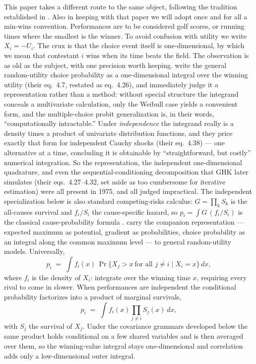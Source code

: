 \documentclass[11pt]{article}
\begin{document}
This paper takes a different route to the same object, following the tradition established in \citet{cotton2021}. Also in keeping with that paper we will adopt once and for all a min-wins
convention. Performances are to be considered golf scores, or running times where the smallest is the winner. To avoid confusion with utility we write $X_i=-U_i$. The crux is that the choice event itself is one-dimensional, by which we mean that contestant $i$ wins
when its time beats the field. The observation is as old as the subject, with one precision worth
keeping. \citet{domencich1975} write the general random-utility choice
probability as a one-dimensional integral over the winning utility
(their eq.~4.7, restated as eq.~4.26), and immediately judge it a
representation rather than a method: without special structure the
integrand conceals a multivariate calculation, only the Weibull case
yields a convenient form, and the multiple-choice probit generalization
is, in their words, ``computationally intractable.'' Under
\emph{independence} the integrand really is a density times a product of
univariate distribution functions, and they price exactly that form for
independent Cauchy shocks (their eq.~4.38) --- one alternative at a
time, concluding it is obtainable by ``straightforward, but costly''
numerical integration. So the representation, the independent
one-dimensional quadrature, and even the sequential-conditioning
decomposition that GHK later simulates (their eqs.~4.27--4.32, set aside
as too cumbersome for iterative estimation) were all present in 1975,
and all judged impractical. The independent specialization below is also standard competing-risks
calculus: $G=\prod_k S_k$ is the all-causes survival and $f_i/S_i$ the
cause-specific hazard, so $p_i=\int G\,(f_i/S_i)$ is the classical
cause-probability formula \citep{kalbfleisch2002}.
\citet{fosgerau2013} carry the companion representation --- expected
maximum as potential, gradient as probabilities, choice probability as
an integral along the common maximum level --- to general
random-utility models. Universally,
\begin{equation}\label{eq:onedim}
p_i \;=\; \int f_i(x)\,
\Pr\{X_j>x\ \text{for all } j\ne i\mid X_i=x\}\,dx,
\end{equation}
where $f_i$ is the density of $X_i$: integrate over the winning time $x$,
requiring every rival to come in slower. When performances are
independent the conditional probability factorizes into a product of
marginal survivals,
\begin{equation}\label{eq:field-intro}
p_i \;=\; \int f_i(x)\prod_{j\ne i}S_j(x)\,dx,
\end{equation}
with $S_j$ the survival of $X_j$. Under the covariance grammars developed
below the same product holds conditional on a few shared variables and is
then averaged over them, so the winning-value integral stays
one-dimensional and correlation adds only a low-dimensional outer
integral.
\end{document}
